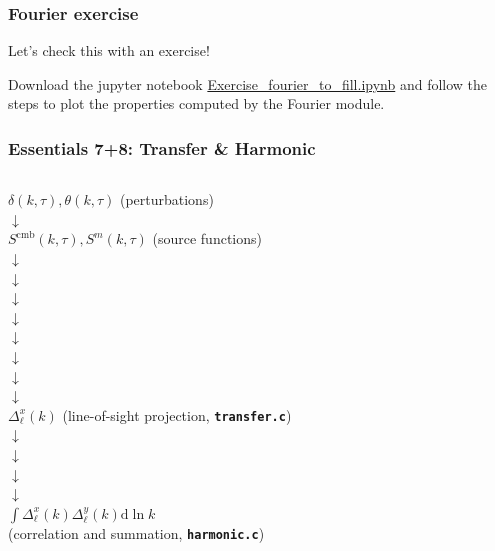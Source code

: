 \begin{frame}[fragile]
	\frametitle{Fourier exercise}
Let's check this with an exercise!

Download the jupyter notebook \href{https://github.com/MarkMos/class_lecture/blob/main/notebooks/Exercise_fourier_to_fill.ipynb}{Exercise\_fourier\_to\_fill.ipynb} and follow the steps to plot the properties computed by the Fourier module.


\end{frame}



\begin{frame}[fragile]
	\frametitle{Essentials 7+8: Transfer \& Harmonic}
	
	\begin{columns}[T] %
	\begin{column}{0.56\textwidth}
		\begin{center}
			$\delta(k,\tau), \theta(k,\tau)$ (perturbations)\\
			$\downarrow$ \\
			$S^\mathrm{cmb}(k,\tau), S^{m}(k,\tau)$ (source functions)\\
			$\downarrow$ \\
			$\downarrow$ \\
			$\downarrow$ \\
			$\downarrow$ \\
			$\downarrow$ \\
			$\downarrow$ \\
			$\downarrow$ \\
			$\downarrow$ \\
			$\Delta^x_\ell(k)$ (line-of-sight projection, {\bf \tt transfer.c})\\
			$\downarrow$ \\
			$\downarrow$ \\
			$\downarrow$ \\
			$\downarrow$ \\
			$\int \Delta^x_\ell(k) \Delta^y_\ell(k) \mathrm{d}\ln k$ \\ (correlation and summation, {\bf \tt harmonic.c})
		\end{center}
	\end{column}
	\begin{column}{0.4\textwidth}

\end{column}
\end{columns}
\end{frame}
